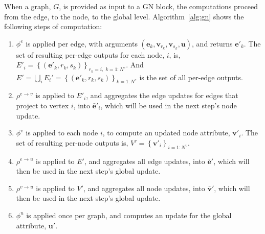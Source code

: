 \documentclass[10pt, onecolumn]{article}
\newcommand{\uv}{\mathbf{u}}    %
\newcommand{\ev}{\mathbf{e}}    %
\newcommand{\vv}{\mathbf{v}}    %
\begin{document}
When a graph, $G$, is provided as input to a GN block, the computations proceed from the edge, to the node, to the global level.
Algorithm~\ref{alg:gn} shows the following steps of computation:
\begin{enumerate}[noitemsep]
    \item $\phi^e$ is applied per edge, with arguments $(\ev_k, \vv_{r_k}, \vv_{s_k}, \uv)$, and returns $\ev'_k$. The set of resulting per-edge outputs for each node, $i$, is, $E'_i = \left\{\left(\mathbf{e}'_k, r_k, s_k \right)\right\}_{r_k=i,\; k=1:N^e}$. And $E' = \bigcup_i E_i' = \left\{\left(\mathbf{e}'_k, r_k, s_k \right)\right\}_{k=1:N^e}$ is the set of all per-edge outputs.
    
    \item $\rho^{e\rightarrow v}$ is applied to $E'_i$, and aggregates the edge updates for edges that project to vertex $i$, into $\mathbf{\bar{e}}'_i$, which will be used in the next step's node update.
    
    \item $\phi^v$ is applied to each node $i$, to compute an updated node attribute, $\mathbf{v}'_i$. The set of resulting per-node outputs is, $V'=\left\{\mathbf{v}'_i\right\}_{i=1:N^v}$.
    
    \item $\rho^{e\rightarrow u}$ is applied to $E'$, and aggregates all edge updates, into $\mathbf{\bar{e}}'$, which will then be used in the next step's global update.
    
    \item $\rho^{v \rightarrow u}$ is applied to $V'$, and aggregates all node updates, into $\mathbf{\bar{v}}'$, which will then be used in the next step's global update.
    
    \item $\phi^u$ is applied once per graph, and computes an update for the global attribute, $\uv'$.
\end{enumerate}













\printindex

\newpage

\nocite{*}

\end{document}
